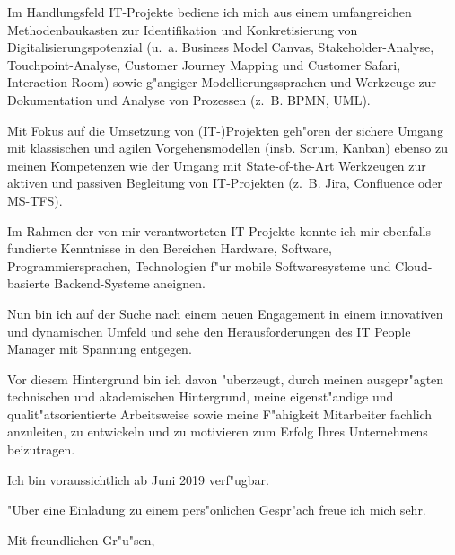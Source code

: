 \documentclass[10pt,a4paper]{dinbrief}
\begin{document}
\begin{letter}
Im Handlungsfeld IT-Projekte bediene ich mich aus einem umfangreichen Methodenbaukasten zur Identifikation und Konkretisierung von Digitalisierungspotenzial (u.~a. Business Model Canvas, Stakeholder-Analyse, Touchpoint-Analyse, Customer Journey Mapping und Customer Safari, Interaction Room) sowie g"angiger Modellierungssprachen und Werkzeuge zur Dokumentation und Analyse von Prozessen (z.~B. BPMN, UML).

Mit Fokus auf die Umsetzung von (IT-)Projekten geh"oren der sichere Umgang mit klassischen und agilen Vorgehensmodellen (insb. Scrum, Kanban) ebenso zu meinen Kompetenzen wie der Umgang mit State-of-the-Art Werkzeugen zur aktiven und passiven Begleitung von IT-Projekten (z.~B. Jira, Confluence oder MS-TFS). 

Im Rahmen der von mir verantworteten IT-Projekte konnte ich mir ebenfalls fundierte Kenntnisse in den Bereichen Hardware, Software, Programmiersprachen, Technologien f"ur mobile Softwaresysteme und Cloud-basierte Backend-Systeme aneignen.

Nun bin ich auf der Suche nach einem neuen Engagement in einem innovativen und dynamischen Umfeld und sehe den Herausforderungen des IT People Manager mit Spannung entgegen.

Vor diesem Hintergrund bin ich davon "uberzeugt, durch meinen ausgepr"agten technischen und akademischen Hintergrund, meine eigenst"andige und qualit"atsorientierte Arbeitsweise sowie meine F"ahigkeit Mitarbeiter fachlich anzuleiten, zu entwickeln und zu motivieren zum Erfolg Ihres Unternehmens beizutragen.

Ich bin voraussichtlich ab Juni 2019 verf"ugbar. %

"Uber eine Einladung zu einem pers"onlichen Gespr"ach freue ich mich sehr.

\closing{Mit freundlichen Gr"u"sen,}
\end{letter}
\end{document}

